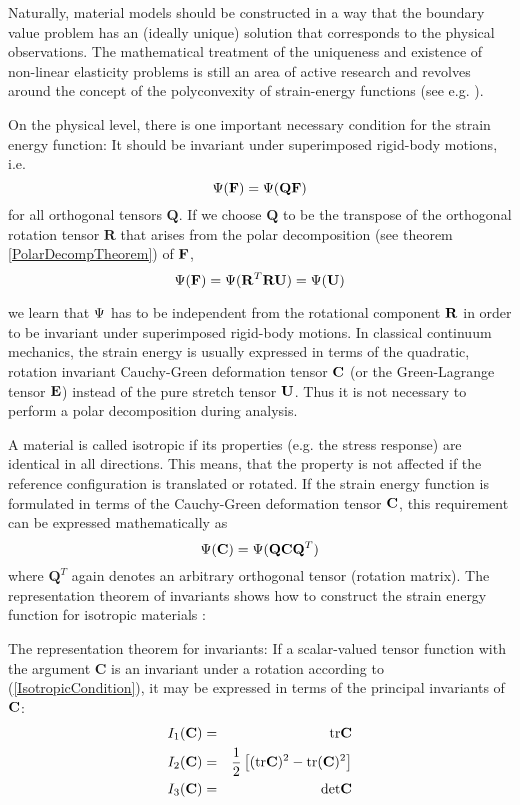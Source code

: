 Naturally, material models should be constructed in a way that the boundary value problem has an (ideally unique) solution that corresponds to the physical observations. The mathematical treatment of the uniqueness and existence of non-linear elasticity problems is still an area of active research and revolves around the concept of the polyconvexity of strain-energy functions (see e.g. \cite{Hartmann2003} \cite{Hughes1994}). 

On the physical level, there is one important necessary condition for the strain energy function: It should be invariant under superimposed rigid-body motions, i.e.
 \begin{equation}
\Psi (\mathbf {F }) = \Psi (\mathbf Q \mathbf {F })
\end{equation}
for all orthogonal tensors $\mathbf Q$. If we choose $\mathbf Q$ to be the transpose of the orthogonal rotation tensor $\mathbf R$ that arises from the polar decomposition (see theorem \ref{PolarDecompTheorem}) of $\mathbf {F }$, 
 \begin{equation}
\Psi (\mathbf {F }) = \Psi (\mathbf{R} ^T \mathbf{R} \mathbf {U} ) = \Psi (\mathbf {U} )
\end{equation}

we learn that $\Psi$ has to be independent from the rotational component $\mathbf{R}$ in order to be invariant under superimposed rigid-body motions. In classical continuum mechanics, the strain energy is usually expressed in terms of the quadratic, rotation invariant Cauchy-Green deformation tensor $\mathbf {C} $ (or the Green-Lagrange tensor $\mathbf {E} $) instead of the pure stretch tensor $\mathbf {U} $. Thus it is not necessary to perform a polar decomposition during analysis.

A material is called isotropic if its properties (e.g. the stress response) are identical in all directions. This means, that the property is not affected if the reference configuration is translated or rotated. If the strain energy function is formulated in terms of the Cauchy-Green deformation tensor $\mathbf {C} $, this requirement can be expressed mathematically as
 \begin{equation}
\Psi (\mathbf {C} ) = \Psi (\mathbf {Q} \mathbf {C}  \mathbf{Q} ^T) 
\label{IsotropicCondition}
\end{equation}
where $\mathbf Q ^T$ again denotes an arbitrary orthogonal tensor (rotation matrix). The representation theorem of invariants shows how to construct the strain energy function for isotropic materials \cite{Holzapfel2000}:
\begin{theorem}
The representation theorem for invariants: If a scalar-valued tensor function with the argument $\mathbf C$ is an invariant under a rotation according to (\ref{IsotropicCondition}), it may be expressed in terms of the principal invariants of $\mathbf {C} $:
\begin{eqnarray}
I_1(\mathbf {C}  ) &=& \textnormal{tr}  \mathbf {C}  \\
I_2(\mathbf {C}  ) &=& \frac{1}{2} \left[ (\textnormal{tr}  \mathbf {C} )^2 - \textnormal{tr}  (\mathbf {C} )^2 \right] \\
I_3(\mathbf {C}  ) &=&  \textnormal{det} \mathbf {C} 
\end{eqnarray}
\end{theorem}


